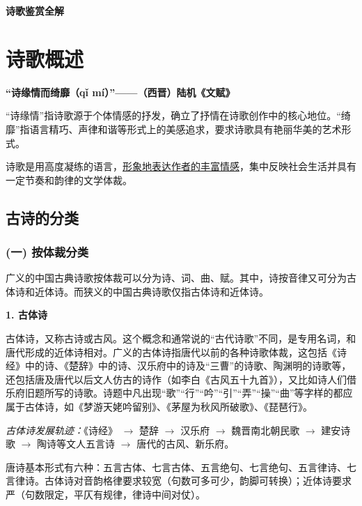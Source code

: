 \documentclass[11pt,a4paper]{article}
\begin{document}
\begin{center}
    \vspace*{2em}
    {\Huge \bfseries \color{primaryblue} 诗歌鉴赏全解} \\[1em]
    \vspace{2em}
\end{center}

\tableofcontents
\newpage

\section{诗歌概述}

\begin{center}
\large \textbf{“诗缘情而绮靡（qǐ mí）”——（西晋）陆机《文赋》}
\end{center}

“诗缘情”指诗歌源于个体情感的抒发，确立了抒情在诗歌创作中的核心地位。“绮靡”指语言精巧、声律和谐等形式上的美感追求，要求诗歌具有艳丽华美的艺术形式。

诗歌是用高度凝练的语言，\underline{形象地表达作者的丰富情感}，集中反映社会生活并具有一定节奏和韵律的文学体裁。

\subsection{古诗的分类}

\subsubsection{(一) 按体裁分类}
广义的中国古典诗歌按体裁可以分为诗、词、曲、赋。其中，诗按音律又可分为古体诗和近体诗。而狭义的中国古典诗歌仅指古体诗和近体诗。

\textbf{1. 古体诗}

古体诗，又称古诗或古风。这个概念和通常说的“古代诗歌”不同，是专用名词，和唐代形成的近体诗相对。广义的古体诗指唐代以前的各种诗歌体裁，这包括《诗经》中的诗、《楚辞》中的诗、汉乐府中的诗及“三曹”的诗歌、陶渊明的诗歌等，还包括唐及唐代以后文人仿古的诗作（如李白《古风五十九首》），又比如诗人们借乐府旧题所写的诗歌。诗题中凡出现“歌”“行”“吟”“引”“弄”“操”“曲”等字样的都应属于古体诗，如《梦游天姥吟留别》、《茅屋为秋风所破歌》、《琵琶行》。

\textit{古体诗发展轨迹：}《诗经》 $\to$ 楚辞 $\to$ 汉乐府 $\to$ 魏晋南北朝民歌 $\to$ 建安诗歌 $\to$ 陶诗等文人五言诗 $\to$ 唐代的古风、新乐府。

唐诗基本形式有六种：五言古体、七言古体、五言绝句、七言绝句、五言律诗、七言律诗。古体诗对音韵格律要求较宽（句数可多可少，韵脚可转换）；近体诗要求严（句数限定，平仄有规律，律诗中间对仗）。
\end{document}
